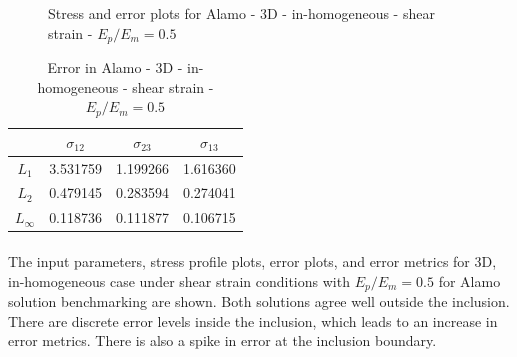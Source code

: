\documentclass[12pt, a4paper]{report}
\begin{document}
\begin{figure}[htbp]
  \centering
  \hfill
  \caption{Stress and error plots for Alamo - 3D - in-homogeneous - shear strain - $E_p/E_m = 0.5$}
\end{figure}

\begin{table}[H]
    \centering
    \begin{tabular}{|c|c|c|c|}
        \hline
        &\textbf{$\sigma_{12}$} &  \textbf{$\sigma_{23}$} & \textbf{$\sigma_{13}$}\\
        \hline
        $L_1$ & 3.531759 & 1.199266 & 1.616360 \\
        \hline
        $L_2$ & 0.479145 & 0.283594 & 0.274041 \\
        \hline 
        $L_\infty$ & 0.118736 & 0.111877 & 0.106715 \\
        \hline
    \end{tabular}
    \caption{Error in Alamo - 3D - in-homogeneous - shear strain - $E_p/E_m = 0.5$}
\end{table}

\paragraph{}
The input parameters, stress profile plots, error plots, and error metrics for 3D, in-homogeneous case under shear strain conditions with $E_p/E_m = 0.5$ for Alamo solution benchmarking are shown. Both solutions agree well outside the inclusion. There are discrete error levels inside the inclusion, which leads to an increase in error metrics. There is also a spike in error at the inclusion boundary.
\end{document}
